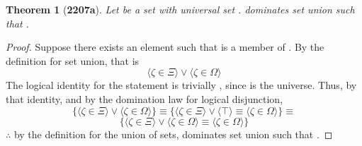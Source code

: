\documentclass[preview]{standalone}
\newtheorem*{theorem*}{Theorem}
\begin{document}
\begin{theorem*}[\textbf{2207a}] \color{black}
    Let \bm{$\Xi$} be a set with universal set \bm{$\Omega$}. 
    \bm{$\Omega$} dominates set union such that 
    \bm{$\Xi \cup \Omega = \Omega$}.
\end{theorem*}
\begin{proof} \color{black}
    Suppose there exists an element \bm{$\zeta$} such that \bm{$\zeta$} is a member of 
    \bm{$\Xi \cup \Omega$}. 
    By the definition for set union, that is
    \begin{equation*}
        \Big \langle \zeta \in \Xi \Big \rangle
            \lor 
        \Big \langle \zeta \in \Omega \Big \rangle
    \end{equation*}
    The logical identity for the statement \bm{$\zeta \in \Omega$} is trivially \bm{$\top$}, 
    since \bm{$\Omega$} is the universe. 
    Thus, 
    by that identity, 
    and by the domination law for logical disjunction,
    \begin{equation*}
        \Bigg\{
            \Big \langle \zeta \in \Xi \Big \rangle 
                \lor 
            \Big \langle \zeta \in \Omega \Big \rangle
        \Bigg\}
            \equiv
        \Bigg\{
            \Big \langle \zeta \in \Xi \Big \rangle 
                \lor 
            \Big \langle \top \Big \rangle
                \equiv
            \Big \langle \zeta \in \Omega \Big \rangle
        \Bigg\}
            \equiv
    \end{equation*}
    \begin{equation*}
        \Bigg\{
            \Big \langle \zeta \in \Xi \Big \rangle 
                \lor 
            \Big \langle \zeta \in \Omega \Big \rangle
                \equiv
            \Big \langle \zeta \in \Omega \Big \rangle
        \Bigg\}
    \end{equation*}
    $\therefore$ by the definition for the union of sets, 
    \bm{$\Omega$} dominates set union such that 
    \bm{$\Xi \cup \Omega = \Omega$}.
\color{lightgray} \end{proof}
\end{document}
